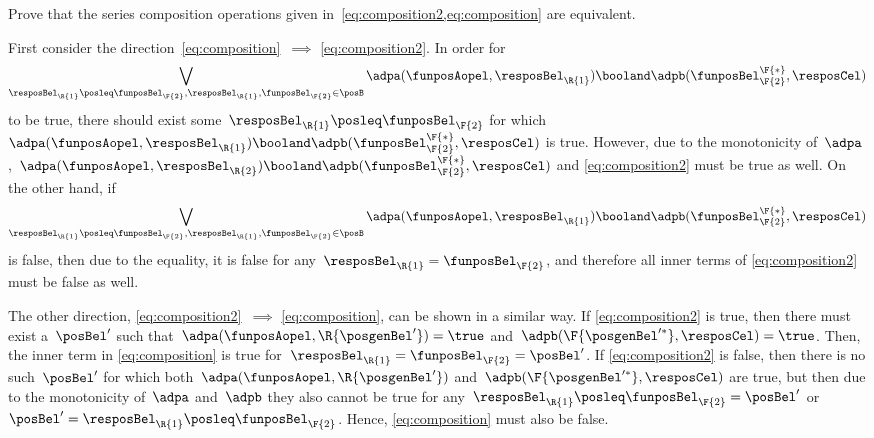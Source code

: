 \begin{exercise}
    \label{ex:composition_equivalency}
    Prove that the series composition operations given in~\cref{eq:composition2,eq:composition} are equivalent.
\end{exercise}
%
\begin{solution}
    First consider the direction~\cref{eq:composition}~$\implies$ \cref{eq:composition2}.
    In order for%
    \begin{equation*}
        \bigvee_{\resposBel_\R{1}\posleq\funposBel_\F{2}, \resposBel_\R{1},\funposBel_\F{2}\in \posB} \adpa(\funposAopel,\resposBel_\R{1}) \booland \adpb(\funposBel_\F{2}^\F{*},\resposCel)%
    \end{equation*}
    to be true, there should exist some~$\resposBel_\R{1}\posleq \funposBel_\F{2}$ for which~$\adpa(\funposAopel,\resposBel_\R{1}) \booland\adpb(\funposBel_\F{2}^\F{*},\resposCel)$ is true.
    However, due to the monotonicity of~$\adpa$,~$\adpa(\funposAopel,\resposBel_\R{2}) \booland \adpb(\funposBel_\F{2}^\F{*},\resposCel)$ and \cref{eq:composition2} must be true as well.
    On the other hand, if%
    \begin{equation*}
        \bigvee_{\resposBel_\R{1}\posleq\funposBel_\F{2}, \resposBel_\R{1},\funposBel_\F{2}\in \posB} \adpa(\funposAopel,\resposBel_\R{1}) \booland \adpb(\funposBel_\F{2}^\F{*},\resposCel)%
    \end{equation*}
    is false, then due to the equality, it is false for any~$\resposBel_\R{1}=\funposBel_\F{2}$, and therefore all inner terms of \cref{eq:composition2} must be false as well.
    
    The other direction, \cref{eq:composition2}~$\implies$ \cref{eq:composition}, can be shown in a similar way.
    If \cref{eq:composition2} is true, then there must exist a~$\posBel'$ such that~$\adpa(\funposAopel, \R{\posgenBel'})=\true$ and~$\adpb(\F{\posgenBel'^*}, \resposCel)=\true$.
    Then, the inner term in \cref{eq:composition} is true for~$\resposBel_\R{1}=\funposBel_\F{2}=\posBel'$.
    If \cref{eq:composition2} is false, then there is no such~$\posBel'$ for which both~$\adpa(\funposAopel, \R{\posgenBel'})$ and~$\adpb(\F{\posgenBel'^*}, \resposCel)$ are true, but then due to the monotonicity of~$\adpa$ and~$\adpb$ they also cannot be true for any~$\resposBel_\R{1} \posleq \funposBel_\F{2} = \posBel'$ or~$\posBel'=\resposBel_\R{1} \posleq \funposBel_\F{2}$.
    Hence, \cref{eq:composition} must also be false.
\end{solution}

